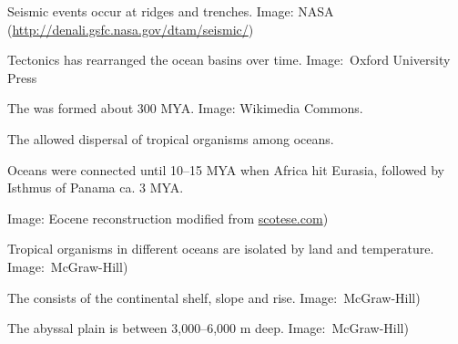 \documentclass[t]{beamer}
\begin{document}
{
\begin{frame}[b]{Seismic events occur at ridges and trenches.}
\tiny Image: NASA (\url{http://denali.gsfc.nasa.gov/dtam/seismic/})
\end{frame}
}

{
\begin{frame}[b]{Tectonics has rearranged the ocean basins over time.}
\hfill\tiny Image: \textcopyright\,Oxford University Press
\end{frame}
}

{
\begin{frame}[b]{The  was formed about 300 MYA.}
\tiny Image: Wikimedia Commons.
\end{frame}
}

{
\begin{frame}[b]{The  allowed dispersal of tropical organisms among oceans.}

\hangpara Oceans were connected until 10–15 MYA when Africa hit Eurasia, followed by Isthmus of Panama ca. 3 MYA.

\tiny\hfill Image: Eocene reconstruction modified from \url{scotese.com})
\end{frame}
}

{
\begin{frame}[b]{Tropical organisms in different oceans are isolated by land and temperature.}
\tiny Image: \textcopyright\,McGraw-Hill)
\end{frame}
}


{
\begin{frame}[b]{The  consists of the continental shelf, slope and rise.}
\tiny Image: \textcopyright\,McGraw-Hill)
\end{frame}
}

{
\begin{frame}[b]{The abyssal plain is between 3,000–6,000 m deep.}
\tiny Image: \textcopyright\,McGraw-Hill)
\end{frame}
}
\end{document}
